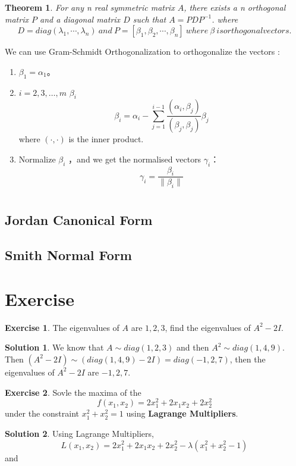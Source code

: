 \documentclass{article}
\newtheorem{theorem}{Theorem}[section]
\theoremstyle{definition}
\newtheorem{exe}{Exercise}[section]
\newtheorem{sol}{Solution}[exe]
\begin{document}
\begin{theorem}
    For any n real symmetric matrix $A$, there exists a n orthogonal matrix $P$ and a diagonal matrix $D$ such that $A=PDP^{-1}$.
    where $$D=diag(\lambda_{1},\cdots,\lambda_{n})\ and\ P=[\beta_{1},\beta_{2},\cdots,\beta_{n}]\ where\ \beta\ is orthogonal vectors.$$
\end{theorem}

We can use Gram-Schmidt Orthogonalization to orthogonalize the vectors :
\begin{enumerate}
    \item $\beta_1 = \alpha_1$。
    \item $i = 2, 3, \ldots, m$  $\beta_i$ 
    \[
    \beta_i = \alpha_i - \sum_{j=1}^{i-1} \frac{(\alpha_i, \beta_j)}{(\beta_j, \beta_j)} \beta_j
    \]
    where $(\cdot, \cdot)$ is the inner product.
    \item Normalize $\beta_i$ ，and we get the normalised vectors $\gamma_i$：
    \[
    \gamma_i = \frac{\beta_i}{\|\beta_i\|}
    \]
\end{enumerate}



\section{}
\subsection{Jordan Canonical Form}

\subsection{Smith Normal Form}








\newpage
\section{Exercise}

\begin{exe}
The eigenvalues of $A$ are $1,2,3$, find the eigenvalues of $A^{2}-2I$.
\end{exe}

\begin{sol}
    We know that $A\sim diag(1,2,3)$ and then $A^{2}\sim diag(1,4,9)$.
    Then $(A^{2}-2I)\sim (diag(1,4,9)-2I)=diag(-1,2,7)$, then the eigenvalues 
    of $A^{2}-2I$ are $-1,2,7$.
\end{sol}

\begin{exe}
    Sovle the maxima of the $$f(x_{1},x_{2})=2x_{1}^{2}+2x_{1}x_{2}+2x_{2}^{2}$$
    under the constraint $x_{1}^{2}+x_{2}^{2}=1$ using \textbf{Lagrange Multipliers}.
\end{exe}

\begin{sol}
    Using Lagrange Multipliers,
    $$L(x_{1},x_{2})=2x_{1}^{2}+2x_{1}x_{2}+2x_{2}^{2}-\lambda(x_{1}^{2}+x_{2}^{2}-1)$$
    and 
  
\end{sol}
\end{document}
